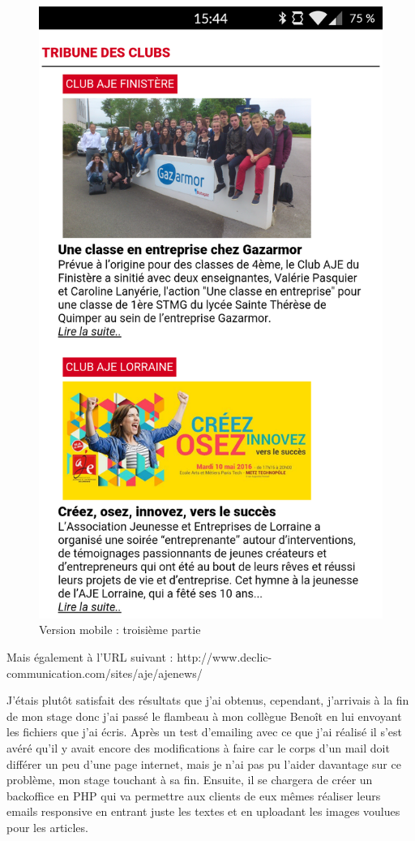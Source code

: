 \documentclass[report]{tnreport}
\begin{document}
\begin{figure}[!htb]
  \includegraphics[width=\linewidth]{figures/aje_mobile3}
  \caption{Version mobile : troisième partie}\label{fig:aje_mobile3}
\endminipage
\end{figure}


\clearpage
Mais également à l’URL suivant : http://www.declic-communication.com/sites/aje/ajenews/


J’étais plutôt satisfait des résultats que j’ai obtenus, cependant, j’arrivais à la fin de mon stage donc j’ai passé le flambeau à mon collègue Benoît en lui envoyant les fichiers que j’ai écris.
Après un test d’emailing avec ce que j’ai réalisé il s’est avéré qu’il y avait encore des modifications à faire car le corps d’un mail doit différer un peu d’une page internet, mais je n’ai pas pu l’aider davantage sur ce problème, mon stage touchant à sa fin. Ensuite, il se chargera de créer un backoffice en PHP qui va permettre aux clients de eux mêmes réaliser leurs emails responsive en entrant juste les textes et en uploadant les images voulues pour les articles.
\end{document}
